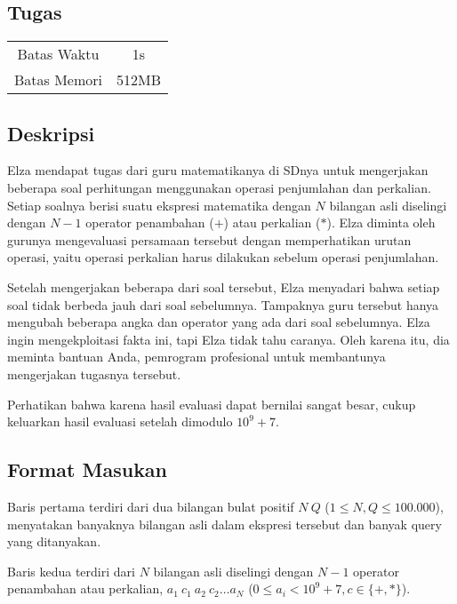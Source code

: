 \documentclass{article}
\begin{document}
\begin{center}
    \section*{Tugas} %

    \begin{tabular}{ | c c | }
        \hline
        Batas Waktu  & 1s \\    %
        Batas Memori & 512MB \\  %
        \hline
    \end{tabular}
\end{center}

\subsection*{Deskripsi}

Elza mendapat tugas dari guru matematikanya di SDnya untuk mengerjakan beberapa soal perhitungan menggunakan operasi penjumlahan dan perkalian. Setiap soalnya berisi suatu ekspresi matematika dengan $N$ bilangan asli diselingi dengan $N-1$ operator penambahan ($+$) atau perkalian ($*$). Elza diminta oleh gurunya mengevaluasi persamaan tersebut dengan memperhatikan urutan operasi, yaitu operasi perkalian harus dilakukan sebelum operasi penjumlahan.

Setelah mengerjakan beberapa dari soal tersebut, Elza menyadari bahwa setiap soal tidak berbeda jauh dari soal sebelumnya. Tampaknya guru tersebut hanya mengubah beberapa angka dan operator yang ada dari soal sebelumnya. Elza ingin mengekploitasi fakta ini, tapi Elza tidak tahu caranya. Oleh karena itu, dia meminta bantuan Anda, pemrogram profesional untuk membantunya mengerjakan tugasnya tersebut.

Perhatikan bahwa karena hasil evaluasi dapat bernilai sangat besar, cukup keluarkan hasil evaluasi setelah dimodulo $10^9+7$.

\subsection*{Format Masukan}

Baris pertama terdiri dari dua bilangan bulat positif $N\:Q$ ($1 \leq N, Q \leq 100.000$), menyatakan banyaknya bilangan asli dalam ekspresi tersebut dan banyak query yang ditanyakan. 

Baris kedua terdiri dari $N$ bilangan asli diselingi dengan $N-1$ operator penambahan atau perkalian, $a_1\:c_1\:a_2\:c_2\ldots a_N$ ($0 \leq a_i < 10^9+7, c \in \{+,*\}$).
\end{document}
